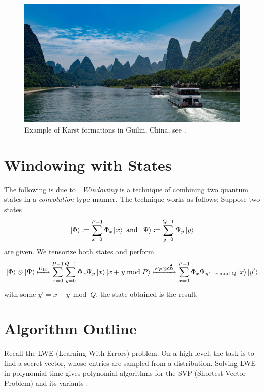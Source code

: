 \documentclass[10pt]{amsart}
\theoremstyle{definition}
\theoremstyle{remark}
\newcommand{\measurementsymbol}{
    \begin{tikzpicture}[>=stealth, semithick, scale=1.5]
        \draw (-0.1, 0) -- (0.1, 0);
        \draw (0.1, 0) arc (0:180:0.1);
        \draw[->] (0, 0) -- (75:0.2);
    \end{tikzpicture}
}
\begin{document}
    \begin{figure}[!hbtp]
        \centering
        \includegraphics[width=0.75\linewidth]{img/87340-Li-River_(29881879337).jpg}
        \caption{Example of Karst formations in Guilin, China, see \cite{Karst_China}.}
        \label{karst_inspiration}
    \end{figure}
    
    \section{Windowing with States} The following is due to \cite[pp. 4-6]{Chen2024}. \emph{Windowing} is a technique of combining two quantum states in a \emph{convolution}-type manner. The technique works as follows: Suppose two states
    \begin{align}
        \ket{\Phi} \coloneqq \sum_{x=0}^{P-1} \Phi_x \ket{x} \text{ and } \ket{\Psi} \coloneqq \sum_{y=0}^{Q-1} \Psi_y \ket{y}
    \end{align}
    are given. We tensorize both states and perform
    \begin{align}
        \ket{\Phi} \otimes \ket{\Psi} \xmapsto{U_{\text{Id}}} \sum_{x=0}^{P-1}\sum_{y=0}^{Q-1} \Phi_x\Psi_y \ket{x}\ket{x+y \bmod P} \xmapsto{E_P \otimes \measurementsymbol} \sum_{x=0}^{P-1} \Phi_x\Psi_{y' - x \bmod Q} \ket{x}\ket{y'}
    \end{align}
    with some \(y' = x+y \bmod Q\), the state obtained is the result.

    \section{Algorithm Outline}

    Recall the LWE (Learning With Errors) problem. On a high level, the task is to find a secret vector, whose entries are sampled from a distribution. Solving LWE in polynomial time gives polynomial algorithms for the SVP (Shortest Vector Problem) and its variants \cite[pp. 1-2]{Chen2024}.
\end{document}
